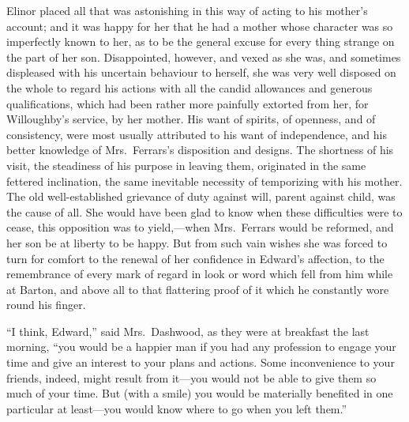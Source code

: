 Elinor placed all that was astonishing in this
way of acting to his mother's account; and it was
happy for her that he had a mother whose character
was so imperfectly known to her, as to be the general
excuse for every thing strange on the part of her son.
Disappointed, however, and vexed as she was, and sometimes
displeased with his uncertain behaviour to herself,
she was very well disposed on the whole to regard his actions
with all the candid allowances and generous qualifications,
which had been rather more painfully extorted from her,
for Willoughby's service, by her mother.  His want of spirits,
of openness, and of consistency, were most usually
attributed to his want of independence, and his better
knowledge of Mrs.\ Ferrars's disposition and designs.
The shortness of his visit, the steadiness of his purpose
in leaving them, originated in the same fettered inclination,
the same inevitable necessity of temporizing with his mother.
The old well-established grievance of duty against will,
parent against child, was the cause of all.  She would have
been glad to know when these difficulties were to cease,
this opposition was to yield,---when Mrs.\ Ferrars would
be reformed, and her son be at liberty to be happy.
But from such vain wishes she was forced to turn for comfort
to the renewal of her confidence in Edward's affection,
to the remembrance of every mark of regard in look or word
which fell from him while at Barton, and above all
to that flattering proof of it which he constantly wore
round his finger.

``I think, Edward,'' said Mrs.\ Dashwood, as they were
at breakfast the last morning, ``you would be a happier man
if you had any profession to engage your time and give
an interest to your plans and actions.  Some inconvenience
to your friends, indeed, might result from it---you
would not be able to give them so much of your time.
But (with a smile) you would be materially benefited
in one particular at least---you would know where to go
when you left them.''

